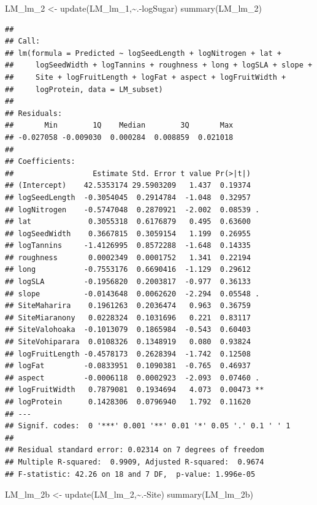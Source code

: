 \documentclass[
  12pt,
]{article}
\newenvironment{Shaded}{\begin{snugshade}}{\end{snugshade}}
\newcommand{\FunctionTok}[1]{\textcolor[rgb]{0.00,0.00,0.00}{#1}}
\newcommand{\NormalTok}[1]{#1}
\newcommand{\OtherTok}[1]{\textcolor[rgb]{0.56,0.35,0.01}{#1}}
\newcommand{\SpecialCharTok}[1]{\textcolor[rgb]{0.00,0.00,0.00}{#1}}
\begin{document}
\begin{Shaded}
\begin{Highlighting}[]
\NormalTok{LM\_lm\_2 }\OtherTok{\textless{}{-}} \FunctionTok{update}\NormalTok{(LM\_lm\_1,}\SpecialCharTok{\textasciitilde{}}\NormalTok{.}\SpecialCharTok{{-}}\NormalTok{logSugar)}
\FunctionTok{summary}\NormalTok{(LM\_lm\_2)}
\end{Highlighting}
\end{Shaded}

\begin{verbatim}
## 
## Call:
## lm(formula = Predicted ~ logSeedLength + logNitrogen + lat + 
##     logSeedWidth + logTannins + roughness + long + logSLA + slope + 
##     Site + logFruitLength + logFat + aspect + logFruitWidth + 
##     logProtein, data = LM_subset)
## 
## Residuals:
##       Min        1Q    Median        3Q       Max 
## -0.027058 -0.009030  0.000284  0.008859  0.021018 
## 
## Coefficients:
##                  Estimate Std. Error t value Pr(>|t|)   
## (Intercept)    42.5353174 29.5903209   1.437  0.19374   
## logSeedLength  -0.3054045  0.2914784  -1.048  0.32957   
## logNitrogen    -0.5747048  0.2870921  -2.002  0.08539 . 
## lat             0.3055318  0.6176879   0.495  0.63600   
## logSeedWidth    0.3667815  0.3059154   1.199  0.26955   
## logTannins     -1.4126995  0.8572288  -1.648  0.14335   
## roughness       0.0002349  0.0001752   1.341  0.22194   
## long           -0.7553176  0.6690416  -1.129  0.29612   
## logSLA         -0.1956820  0.2003817  -0.977  0.36133   
## slope          -0.0143648  0.0062620  -2.294  0.05548 . 
## SiteMaharira    0.1961263  0.2036474   0.963  0.36759   
## SiteMiaranony   0.0228324  0.1031696   0.221  0.83117   
## SiteValohoaka  -0.1013079  0.1865984  -0.543  0.60403   
## SiteVohiparara  0.0108326  0.1348919   0.080  0.93824   
## logFruitLength -0.4578173  0.2628394  -1.742  0.12508   
## logFat         -0.0833951  0.1090381  -0.765  0.46937   
## aspect         -0.0006118  0.0002923  -2.093  0.07460 . 
## logFruitWidth   0.7879081  0.1934694   4.073  0.00473 **
## logProtein      0.1428306  0.0796940   1.792  0.11620   
## ---
## Signif. codes:  0 '***' 0.001 '**' 0.01 '*' 0.05 '.' 0.1 ' ' 1
## 
## Residual standard error: 0.02314 on 7 degrees of freedom
## Multiple R-squared:  0.9909, Adjusted R-squared:  0.9674 
## F-statistic: 42.26 on 18 and 7 DF,  p-value: 1.996e-05
\end{verbatim}

\begin{Shaded}
\begin{Highlighting}[]
\NormalTok{LM\_lm\_2b }\OtherTok{\textless{}{-}} \FunctionTok{update}\NormalTok{(LM\_lm\_2,}\SpecialCharTok{\textasciitilde{}}\NormalTok{.}\SpecialCharTok{{-}}\NormalTok{Site)}
\FunctionTok{summary}\NormalTok{(LM\_lm\_2b)}
\end{Highlighting}
\end{Shaded}
\end{document}
